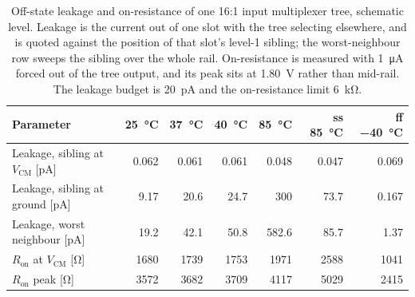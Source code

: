 \begin{table}[htbp]
  \centering
  \caption[{Off-state leakage and on-resistance of one 16:1 input multiplexer tree.}]{Off-state leakage and on-resistance of one 16:1 input multiplexer tree, schematic level. Leakage is the current out of one slot with the tree selecting elsewhere, and is quoted against the position of that slot's level-1 sibling; the worst-neighbour row sweeps the sibling over the whole rail. On-resistance is measured with \SI{1}{\micro\ampere} forced out of the tree output, and its peak sits at \SI{1.80}{\volt} rather than mid-rail. The leakage budget is \SI{20}{\pico\ampere} and the on-resistance limit \SI{6}{\kilo\ohm}.}
  \label{tab:pixtop-mux}
  \begin{tabular}{lrrrrrr}
    \toprule
    Parameter & \SI{25}{\celsius} & \SI{37}{\celsius} & \SI{40}{\celsius} & \SI{85}{\celsius} & ss \SI{85}{\celsius} & ff \SI{-40}{\celsius} \\
    \midrule
    Leakage, sibling at $V_{\mathrm{CM}}$ [\si{\pico\ampere}] & 0.062 & 0.061 & 0.061 & 0.048 & 0.047 & 0.069 \\
    Leakage, sibling at ground [\si{\pico\ampere}]            & 9.17  & 20.6  & 24.7  & 300   & 73.7  & 0.167 \\
    Leakage, worst neighbour [\si{\pico\ampere}]              & 19.2  & 42.1  & 50.8  & 582.6 & 85.7  & 1.37 \\
    \midrule
    $R_{\mathrm{on}}$ at $V_{\mathrm{CM}}$ [\si{\ohm}] & 1680 & 1739 & 1753 & 1971 & 2588 & 1041 \\
    $R_{\mathrm{on}}$ peak [\si{\ohm}]                 & 3572 & 3682 & 3709 & 4117 & 5029 & 2415 \\
    \bottomrule
  \end{tabular}
\end{table}
